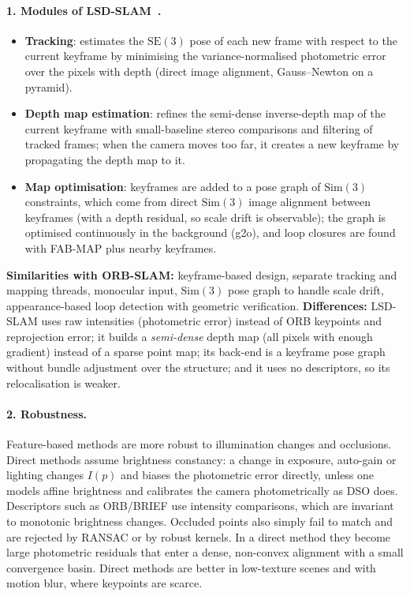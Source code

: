 \paragraph{1. Modules of LSD-SLAM~\cite{engel2014lsd}.}
\begin{itemize}
\item \textbf{Tracking}: estimates the $\mathrm{SE}(3)$ pose of each new frame with respect to
  the current keyframe by minimising the variance-normalised photometric error over the
  pixels with depth (direct image alignment, Gauss--Newton on a pyramid).
\item \textbf{Depth map estimation}: refines the semi-dense inverse-depth map of the current
  keyframe with small-baseline stereo comparisons and filtering of tracked frames; when
  the camera moves too far, it creates a new keyframe by propagating the depth map to it.
\item \textbf{Map optimisation}: keyframes are added to a pose graph of $\mathrm{Sim}(3)$
  constraints, which come from direct $\mathrm{Sim}(3)$ image alignment between keyframes
  (with a depth residual, so scale drift is observable); the graph is optimised
  continuously in the background (g2o), and loop closures are found with FAB-MAP plus
  nearby keyframes.
\end{itemize}
\textbf{Similarities with ORB-SLAM:} keyframe-based design, separate tracking and mapping
threads, monocular input, $\mathrm{Sim}(3)$ pose graph to handle scale drift, appearance-based
loop detection with geometric verification. \textbf{Differences:} LSD-SLAM uses raw intensities
(photometric error) instead of ORB keypoints and reprojection error; it builds a
\emph{semi-dense} depth map (all pixels with enough gradient) instead of a sparse point map;
its back-end is a keyframe pose graph without bundle adjustment over the structure; and it
uses no descriptors, so its relocalisation is weaker.

\paragraph{2. Robustness.}
Feature-based methods are more robust to illumination changes and occlusions. Direct methods
assume brightness constancy: a change in exposure, auto-gain or lighting changes $I(p)$ and
biases the photometric error directly, unless one models affine brightness and calibrates
the camera photometrically as DSO does. Descriptors such as ORB/BRIEF use intensity
comparisons, which are invariant to monotonic brightness changes. Occluded points also simply fail to
match and are rejected by RANSAC or by robust kernels. In a direct method they become large
photometric residuals that enter a dense, non-convex alignment with a small convergence
basin. Direct methods are better in low-texture scenes and with motion blur, where keypoints
are scarce.

